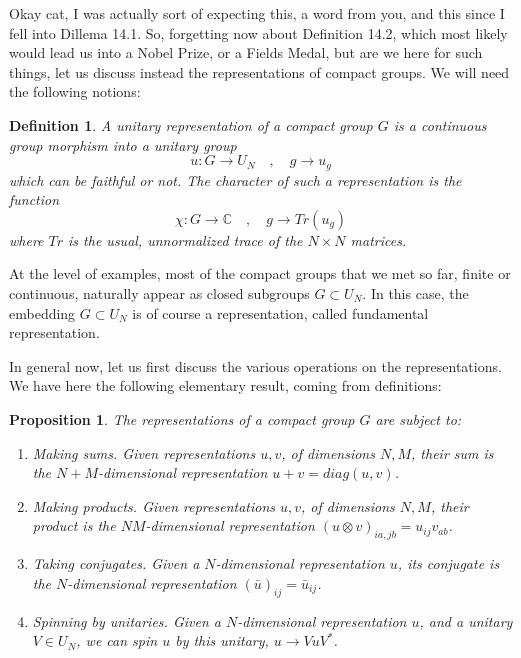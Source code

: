 \documentclass[12pt]{amsbook}
\newtheorem{definition}[theorem]{Definition}
\newtheorem{proposition}[theorem]{Proposition}
\begin{document}
Okay cat, I was actually sort of expecting this, a word from you, and this since I fell into Dillema 14.1. So, forgetting now about Definition 14.2, which most likely would lead us into a Nobel Prize, or a Fields Medal, but are we here for such things, let us discuss instead the representations of compact groups. We will need the following notions:

\begin{definition}
A unitary representation of a compact group $G$ is a continuous group morphism into a unitary group
$$u:G\to U_N\quad,\quad g\to u_g$$
which can be faithful or not. The character of such a representation is the function
$$\chi:G\to\mathbb C\quad,\quad g\to Tr(u_g)$$
where $Tr$ is the usual, unnormalized trace of the $N\times N$ matrices.
\end{definition}

At the level of examples, most of the compact groups that we met so far, finite or continuous, naturally appear as closed subgroups $G\subset U_N$. In this case, the embedding $G\subset U_N$ is of course a representation, called fundamental representation.

\bigskip

In general now, let us first discuss the various operations on the representations. We have here the following elementary result, coming from definitions:

\begin{proposition}
The representations of a compact group $G$ are subject to:
\begin{enumerate}
\item Making sums. Given representations $u,v$, of dimensions $N,M$, 
their sum is the $N+M$-dimensional representation $u+v=diag(u,v)$.

\item Making products. Given representations $u,v$, of dimensions $N,M$, their product is the $NM$-dimensional representation $(u\otimes v)_{ia,jb}=u_{ij}v_{ab}$.

\item Taking conjugates. Given a $N$-dimensional representation $u$, its conjugate is the $N$-dimensional representation $(\bar{u})_{ij}=\bar{u}_{ij}$.

\item Spinning by unitaries. Given a $N$-dimensional representation $u$, and a unitary $V\in U_N$, we can spin $u$ by this unitary, $u\to VuV^*$.
\end{enumerate}
\end{proposition}
\end{document}
